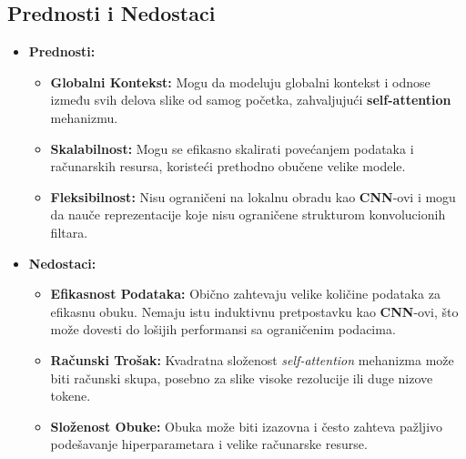 \documentclass[12pt]{article}
\begin{document}
   \subsection{Prednosti i Nedostaci}
   \begin{itemize}
      \item \textbf{Prednosti:}
      \begin{itemize}
          \item \textbf{Globalni Kontekst:} Mogu da modeluju globalni kontekst 
          i odnose između svih delova slike od samog početka, zahvaljujući \textbf{self-attention} 
          mehanizmu.
          \item \textbf{Skalabilnost:} Mogu se efikasno skalirati povećanjem podataka i računarskih 
          resursa, koristeći prethodno obučene velike modele.
          \item \textbf{Fleksibilnost:} Nisu ograničeni na lokalnu obradu kao \textbf{CNN}-ovi i 
          mogu da nauče reprezentacije koje nisu ograničene strukturom konvolucionih filtara.
      \end{itemize}
      \item \textbf{Nedostaci:}
      \begin{itemize}
         \item \textbf{Efikasnost Podataka:} Obično zahtevaju velike količine 
         podataka za efikasnu obuku. Nemaju istu induktivnu pretpostavku kao \textbf{CNN}-ovi, 
         što može dovesti do lošijih performansi sa ograničenim podacima.
         \item \textbf{Računski Trošak:} Kvadratna složenost \textit{self-attention} mehanizma 
         može biti računski skupa, posebno za slike visoke rezolucije ili duge nizove tokene.
         \item \textbf{Složenost Obuke:} Obuka može biti izazovna i često zahteva pažljivo 
         podešavanje hiperparametara i velike računarske resurse.
      \end{itemize}
  \end{itemize}

\end{document}

